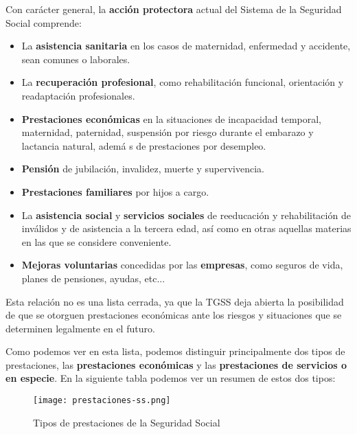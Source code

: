 Con carácter general, la \textbf{acción protectora} actual del Sistema de la Seguridad Social comprende:
\begin{itemize}
    \item La \textbf{asistencia sanitaria} en los casos de maternidad, enfermedad y accidente, sean comunes o laborales.
    \item La \textbf{recuperación profesional}, como rehabilitación funcional, orientación y readaptación profesionales.
    \item \textbf{Prestaciones económicas} en la situaciones de incapacidad temporal, maternidad, paternidad, suspensión por riesgo durante el embarazo y lactancia natural, ademá s de prestaciones por desempleo.
    \item \textbf{Pensión} de jubilación, invalidez, muerte y supervivencia.
    \item \textbf{Prestaciones familiares} por hijos a cargo.
    \item  La \textbf{asistencia social} y \textbf{servicios sociales} de reeducación y rehabilitación de inválidos y de asistencia a la tercera edad, así como en otras aquellas materias en las que se considere conveniente.
    \item \textbf{Mejoras voluntarias} concedidas por las \textbf{empresas}, como seguros de vida, planes de pensiones, ayudas, etc...
\end{itemize}

Esta relación no es una lista cerrada, ya que la TGSS deja abierta la posibilidad de que se otorguen prestaciones económicas ante los riesgos y situaciones que se determinen legalmente en el futuro.

Como podemos ver en esta lista, podemos distinguir principalmente dos tipos de prestaciones, las \textbf{prestaciones económicas} y las \textbf{prestaciones de servicios o en especie}. En la siguiente tabla podemos ver un resumen de estos dos tipos:

\begin{figure}[H]
    \centering
    \texttt{[image: prestaciones-ss.png]}
    \caption{Tipos de prestaciones de la Seguridad Social}
\end{figure}

